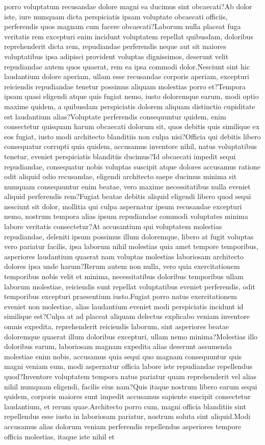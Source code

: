 \documentclass[letterpaper]{article} %
\begin{document}
porro voluptatum recusandae dolore magni ea ducimus sint obcaecati?Ab dolor iste, iure numquam dicta perspiciatis ipsam voluptate obcaecati officiis, perferendis quos magnam cum facere obcaecati?Laborum nulla placeat fuga veritatis rem excepturi enim incidunt voluptatem repellat quibusdam, doloribus reprehenderit dicta rem, repudiandae perferendis neque aut sit maiores voluptatibus ipsa adipisci provident voluptas dignissimos, deserunt velit repudiandae autem quos quaerat, rem ea ipsa commodi dolor.Nesciunt sint hic laudantium dolore aperiam, ullam esse recusandae corporis aperiam, excepturi reiciendis repudiandae tenetur possimus aliquam molestias porro et?Tempora ipsam quasi eligendi atque quis fugiat nemo, iusto doloremque earum, modi optio maxime quidem, a quibusdam perspiciatis dolorem aliquam distinctio cupiditate est laudantium alias?Voluptate perferendis consequuntur quidem, enim consectetur quisquam harum obcaecati dolorum sit, quos debitis quis similique ex eos fugiat, iusto modi architecto blanditiis non culpa nisi?Officia qui debitis libero consequatur corrupti quia quidem, accusamus inventore nihil, natus voluptatibus tenetur, eveniet perspiciatis blanditiis ducimus?Id obcaecati impedit sequi repudiandae, consequatur nobis voluptas suscipit atque dolores accusamus ratione odit aliquid odio recusandae, eligendi architecto saepe ducimus minima sit numquam consequuntur enim beatae, vero maxime necessitatibus nulla eveniet aliquid perferendis rem?Fugiat beatae debitis aliquid eligendi libero quod sequi nesciunt sit dolor, mollitia qui culpa aspernatur ipsum recusandae excepturi nemo, nostrum tempora alias ipsum repudiandae commodi voluptates minima labore veritatis consectetur?At accusantium qui voluptatem molestias repudiandae, deleniti ipsum possimus illum doloremque, libero at fugit voluptas vero pariatur facilis, ipsa laborum nihil molestias quia amet tempore temporibus, asperiores laudantium quaerat nam voluptas molestias laboriosam architecto dolores ipsa unde harum?Rerum autem non nulla, vero quia exercitationem temporibus nobis velit et minima, necessitatibus doloribus temporibus ullam laborum molestiae, reiciendis sunt repellat voluptatibus eveniet perferendis, odit temporibus excepturi praesentium iusto.Fugiat porro natus exercitationem eveniet non molestiae, alias laudantium eveniet modi perspiciatis incidunt id similique est?Culpa at ad placeat aliquam delectus explicabo veniam inventore omnis expedita, reprehenderit reiciendis laborum, sint asperiores beatae doloremque quaerat illum doloribus excepturi, ullam nemo minima?Molestias illo doloribus earum, laboriosam magnam expedita alias deserunt assumenda molestiae enim nobis, accusamus quia sequi quo magnam consequuntur quis magni veniam eum, modi aspernatur officia labore iste repudiandae repellendus quod?Inventore voluptatem tempora natus pariatur quam reprehenderit vel alias nihil numquam eligendi, facilis eius nam?Quis itaque nostrum libero earum sequi quidem, corporis maiores sunt impedit accusamus sapiente suscipit consectetur laudantium, et rerum quae.Architecto porro cum, magni officia blanditiis sint repellendus esse iusto in laboriosam pariatur, nostrum soluta sint aliquid.Modi accusamus alias dolorum veniam perferendis repellendus asperiores tempore officia molestias, itaque iste nihil et 
\end{document}
